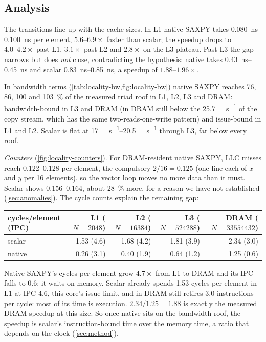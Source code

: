 \subsection{Analysis}
The transitions line up with the cache sizes. In L1 native SAXPY takes
\qtyrange{0.080}{0.100}{\nano\second} per element, $5.6\text{--}6.9\times$ faster than scalar; the
speedup drops to $4.0\text{--}4.2\times$ past L1, $3.1\times$ past L2 and $2.8\times$ on the L3
plateau. Past L3 the gap narrows but does \emph{not} close, contradicting the hypothesis: native
takes \qtyrange{0.43}{0.45}{\nano\second} and scalar \qtyrange{0.83}{0.85}{\nano\second}, a speedup
of $1.88\text{--}1.96\times$.

In bandwidth terms (\cref{tab:locality-bw,fig:locality-bw}) native SAXPY reaches 76, 86, 100 and
\SI{103}{\percent} of the measured triad roof in L1, L2, L3 and DRAM: bandwidth-bound in L3 and DRAM
(in DRAM still below the \qty{25.7}{\gibi\byte\per\second} of the copy stream, which has the same
two-reads-one-write pattern) and issue-bound in L1 and L2. Scalar is flat at
\qtyrange{17}{20.5}{\gibi\byte\per\second} through L3, far below every roof.

\emph{Counters} (\cref{fig:locality-counters}). For DRAM-resident native SAXPY, LLC misses reach
\numrange{0.122}{0.128} per element, the compulsory $2/16 = 0.125$ (one line each of $x$ and $y$ per
\num{16} elements), so the vector loop moves no more data than it must. Scalar shows
\numrange{0.156}{0.164}, about \SI{28}{\percent} more, for a reason we have not established
(\cref{sec:anomalies}). The cycle counts explain
the remaining gap:

\begin{center}\small
  \begin{tabular}{@{}lrrrr@{}}
    \toprule
    cycles/element (IPC) & L1 ($N=\num{2048}$) & L2 ($N=\num{16384}$) & L3 ($N=\num{524288}$) & DRAM ($N=\num{33554432}$) \\
    \midrule
    scalar & 1.53 (4.6) & 1.68 (4.2) & 1.81 (3.9) & 2.34 (3.0) \\
    native & 0.26 (3.1) & 0.40 (1.9) & 0.64 (1.2) & 1.25 (0.6) \\
    \bottomrule
  \end{tabular}
\end{center}
Native SAXPY's cycles per element grow $4.7\times$ from L1 to DRAM and its IPC falls to \num{0.6}:
it waits on memory. Scalar already spends \num{1.53} cycles per element in L1 at IPC \num{4.6}, this
core's issue limit, and in DRAM still retires \num{3.0} instructions per cycle: most of its time is
execution. $2.34/1.25 = 1.88$ is exactly the measured DRAM speedup at this size. So once
native sits on the bandwidth roof, the speedup is scalar's instruction-bound time over the memory
time, a ratio that depends on the clock (\cref{sec:method}).
